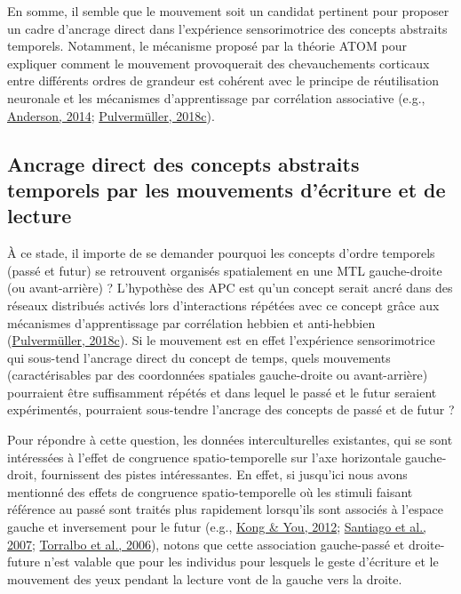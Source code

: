 \documentclass[
  a4paper,12pt,twoside,onecolumn,openright,final,oldfontcommands]{memoir}
\begin{document}
En somme, il semble que le mouvement soit un candidat pertinent pour proposer un cadre d'ancrage direct dans l'expérience sensorimotrice des concepts abstraits temporels. Notamment, le mécanisme proposé par la théorie ATOM pour expliquer comment le mouvement provoquerait des chevauchements corticaux entre différents ordres de grandeur est cohérent avec le principe de réutilisation neuronale et les mécanismes d'apprentissage par corrélation associative (e.g., \protect\hyperlink{ref-anderson_after_2014}{Anderson, 2014}; \protect\hyperlink{ref-pulvermuller_case_2018}{Pulvermüller, 2018c}).

\hypertarget{ancrage-direct-des-concepts-abstraits-temporels-par-les-mouvements-duxe9criture-et-de-lecture}{%
\subsection{Ancrage direct des concepts abstraits temporels par les mouvements d'écriture et de lecture}\label{ancrage-direct-des-concepts-abstraits-temporels-par-les-mouvements-duxe9criture-et-de-lecture}}

À ce stade, il importe de se demander pourquoi les concepts d'ordre temporels (passé et futur) se retrouvent organisés spatialement en une MTL gauche-droite (ou avant-arrière) ? L'hypothèse des APC est qu'un concept serait ancré dans des réseaux distribués activés lors d'interactions répétées avec ce concept grâce aux mécanismes d'apprentissage par corrélation hebbien et anti-hebbien (\protect\hyperlink{ref-pulvermuller_case_2018}{Pulvermüller, 2018c}). Si le mouvement est en effet l'expérience sensorimotrice qui sous-tend l'ancrage direct du concept de temps, quels mouvements (caractérisables par des coordonnées spatiales gauche-droite ou avant-arrière) pourraient être suffisamment répétés et dans lequel le passé et le futur seraient expérimentés, pourraient sous-tendre l'ancrage des concepts de passé et de futur ?

Pour répondre à cette question, les données interculturelles existantes, qui se sont intéressées à l'effet de congruence spatio-temporelle sur l'axe horizontale gauche-droit, fournissent des pistes intéressantes. En effet, si jusqu'ici nous avons mentionné des effets de congruence spatio-temporelle où les stimuli faisant référence au passé sont traités plus rapidement lorsqu'ils sont associés à l'espace gauche et inversement pour le futur (e.g., \protect\hyperlink{ref-kong_space-time_2012}{Kong \& You, 2012}; \protect\hyperlink{ref-santiago_time_2007}{Santiago et al., 2007}; \protect\hyperlink{ref-torralbo_flexible_2006}{Torralbo et al., 2006}), notons que cette association gauche-passé et droite-future n'est valable que pour les individus pour lesquels le geste d'écriture et le mouvement des yeux pendant la lecture vont de la gauche vers la droite.
\end{document}

